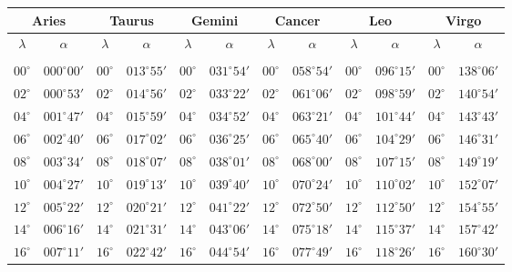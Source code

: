\clearpage
\begin{table}[!h]
\vspace{0.25cm}
\centering
{\scriptsize\begin{tabular}{cc|cc|cc|cc|cc|cc}
\multicolumn{2}{c}{Aries}\vline & \multicolumn{2}{c}{Taurus} \vline& \multicolumn{2}{c}{Gemini} \vline& \multicolumn{2}{c}{Cancer}\vline &
\multicolumn{2}{c}{Leo}\vline & \multicolumn{2}{c}{Virgo}\\\hline
$\lambda$& $\alpha$& $\lambda$& $\alpha$& $\lambda$& $\alpha$& $\lambda$& $\alpha$& $\lambda$& $\alpha$& $\lambda$& $\alpha$\\\hline
&&&&&&&&&&&\\[-2ex]
$00^\circ$ & $000^\circ00'$ & $00^\circ$ & $013^\circ55'$ & $00^\circ$ & $031^\circ54'$ & $00^\circ$ & $058^\circ54'$ & $00^\circ$ & $096^\circ15'$ & $00^\circ$ & $138^\circ06'$\\
$02^\circ$ & $000^\circ53'$ & $02^\circ$ & $014^\circ56'$ & $02^\circ$ & $033^\circ22'$ & $02^\circ$ & $061^\circ06'$ & $02^\circ$ & $098^\circ59'$ & $02^\circ$ & $140^\circ54'$\\
$04^\circ$ & $001^\circ47'$ & $04^\circ$ & $015^\circ59'$ & $04^\circ$ & $034^\circ52'$ & $04^\circ$ & $063^\circ21'$ & $04^\circ$ & $101^\circ44'$ & $04^\circ$ & $143^\circ43'$\\
$06^\circ$ & $002^\circ40'$ & $06^\circ$ & $017^\circ02'$ & $06^\circ$ & $036^\circ25'$ & $06^\circ$ & $065^\circ40'$ & $06^\circ$ & $104^\circ29'$ & $06^\circ$ & $146^\circ31'$\\
$08^\circ$ & $003^\circ34'$ & $08^\circ$ & $018^\circ07'$ & $08^\circ$ & $038^\circ01'$ & $08^\circ$ & $068^\circ00'$ & $08^\circ$ & $107^\circ15'$ & $08^\circ$ & $149^\circ19'$\\
$10^\circ$ & $004^\circ27'$ & $10^\circ$ & $019^\circ13'$ & $10^\circ$ & $039^\circ40'$ & $10^\circ$ & $070^\circ24'$ & $10^\circ$ & $110^\circ02'$ & $10^\circ$ & $152^\circ07'$\\
$12^\circ$ & $005^\circ22'$ & $12^\circ$ & $020^\circ21'$ & $12^\circ$ & $041^\circ22'$ & $12^\circ$ & $072^\circ50'$ & $12^\circ$ & $112^\circ50'$ & $12^\circ$ & $154^\circ55'$\\
$14^\circ$ & $006^\circ16'$ & $14^\circ$ & $021^\circ31'$ & $14^\circ$ & $043^\circ06'$ & $14^\circ$ & $075^\circ18'$ & $14^\circ$ & $115^\circ37'$ & $14^\circ$ & $157^\circ42'$\\
$16^\circ$ & $007^\circ11'$ & $16^\circ$ & $022^\circ42'$ & $16^\circ$ & $044^\circ54'$ & $16^\circ$ & $077^\circ49'$ & $16^\circ$ & $118^\circ26'$ & $16^\circ$ & $160^\circ30'$\\

\end{tabular}}
\end{table}
